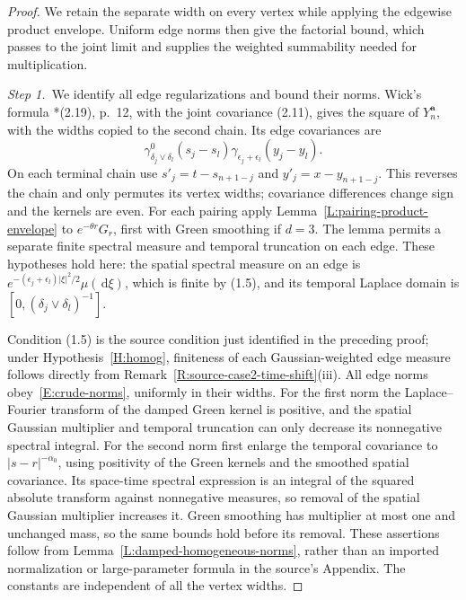 \documentclass[12pt,oneside,openany]{book}
\numberwithin{equation}{section}
\theoremstyle{nogostyle}
\theoremstyle{definition}
\newcommand{\ud}{\,\mathrm{d}}
\begin{document}
\begin{proof}
  We retain the separate width on every vertex while applying the edgewise
  product envelope. Uniform edge norms then give the factorial bound, which
  passes to the joint limit and supplies the weighted summability needed for
  multiplication.


  \medskip
  \noindent\textit{Step 1.~}We identify all edge regularizations and bound
  their norms.
  Wick's formula \cite{chen:author2026:time-dependency}*{(2.19), p.~12}, with
  the joint covariance (2.11), gives the square of $Y_n^{\boldsymbol a}$, with
  the widths copied to the second chain. Its edge covariances are
  \[
    \gamma^0_{\delta_j\vee\delta_l}(s_j-s_l)
    \gamma_{\epsilon_j+\epsilon_l}(y_j-y_l).
  \]
  On each terminal chain use $s'_j = t-s_{n+1-j}$ and $y'_j = x-y_{n+1-j}$. This
  reverses the chain and only permutes its vertex widths; covariance differences
  change sign and the kernels are even. For each pairing apply
  Lemma~\ref{L:pairing-product-envelope} to $e^{-\theta r}G_r$, first with Green
  smoothing if $d = 3$. The lemma permits a separate finite spectral measure and
  temporal truncation on each edge. These hypotheses hold here: the spatial
  spectral measure on an edge is
  $e^{-(\epsilon_j+\epsilon_l)|\xi|^2/2}\mu(\ud\xi)$, which is finite by (1.5),
  and its temporal Laplace domain is $[0,(\delta_j\vee\delta_l)^{-1}]$.

  Condition (1.5) is the source condition just identified in the preceding
  proof; under Hypothesis~\ref{H:homog}, finiteness of each Gaussian-weighted
  edge measure follows directly from
  Remark~\ref{R:source-case2-time-shift}(iii).
  All edge norms obey~\eqref{E:crude-norms}, uniformly in their widths. For the
  first norm the Laplace--Fourier transform of the damped Green kernel is
  positive, and the spatial Gaussian multiplier and temporal truncation can only
  decrease its nonnegative spectral integral. For the second norm first enlarge
  the temporal covariance to $|s-r|^{-\alpha_0}$, using positivity of the Green
  kernels and the smoothed spatial covariance. Its space-time spectral
  expression is an integral of the squared absolute transform against
  nonnegative measures, so removal of the spatial Gaussian multiplier increases
  it. Green smoothing has multiplier at most one and unchanged mass, so the same
  bounds hold before its removal. These assertions follow from
  Lemma~\ref{L:damped-homogeneous-norms}, rather than an imported normalization
  or large-parameter formula in the source's Appendix. The constants are
  independent of all the vertex widths.



\end{proof}
\end{document}
